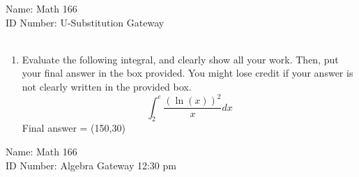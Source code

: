 \documentclass{article}
\begin{document}
\large
\noindent Name: \underline{\hspace{2.5 in}}  \hfill Math 166\\
\noindent ID Number: \underline{\hspace{2.5 in}} \hfill U-Substitution Gateway\\\

\begin{enumerate}
	\item Evaluate the following integral, and clearly show all your work.  Then, put your final answer in the box provided.  You might lose credit if your answer is not clearly written in the provided box.
	\[
	\displaystyle \int_2^e \frac{(\ln(x))^2}{x}dx
	\]
	\vfill
	Final answer = \framebox(150,30){}
\end{enumerate}
\newpage 
	
\large
\noindent Name: \underline{\hspace{2.5 in}}  \hfill Math 166\\
\noindent ID Number: \underline{\hspace{2.5 in}} \hfill Algebra Gateway 12:30 pm\\\ 
\end{document}
